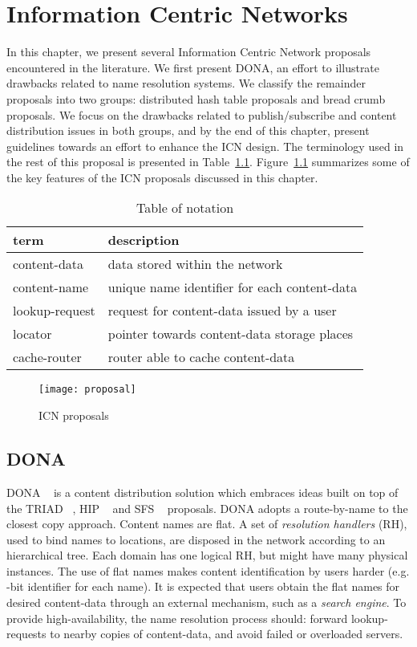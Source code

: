 \chapter{Information Centric Networks}
\label{chapt:icn}
 
In this chapter, we present several Information Centric Network proposals encountered in the literature.
We first present DONA, an effort to illustrate drawbacks related to name resolution systems.
We classify the remainder proposals into two groups:  distributed hash table proposals and 
bread crumb proposals. We focus on the drawbacks related to publish/subscribe and content distribution issues
in both groups, and by the end of this chapter, present guidelines towards an effort to enhance the ICN design. 
The terminology used in the rest of this proposal is presented in Table~\ref{terminology}.  
Figure~\ref{tabproposals} summarizes some of the key features of the ICN proposals discussed in this chapter.


\vspace{0.1in}

\begin{table}[h!]
\center
\begin{tabular}{l|l}
\hline
\textbf{term} & \textbf{description} \\
\hline
\hline
content-data & data stored within the network \\
content-name &  unique name identifier for each content-data \\ 
lookup-request & request for content-data issued by a user \\
locator &  pointer towards content-data storage places \\
cache-router & router able to cache content-data \\
\hline
\end{tabular}
\caption{Table of notation}
\label{terminology}
\end{table}

 
\begin{figure}
\center
\texttt{[image: proposal]}
\label{tabproposals}
\caption{ICN proposals}
\end{figure}


\section{DONA}

DONA ~\cite{dona} is a content distribution solution which embraces ideas built on top of the 
TRIAD ~\cite{triad}, HIP ~\cite{hip} and SFS ~\cite{sfs} proposals. 
DONA adopts a route-by-name to the closest copy approach. Content names are flat. A set of 
\emph{resolution handlers} (RH), used to bind names to locations, are disposed in the network according to an hierarchical tree. Each domain 
has one logical RH, but might have  many physical instances. The use of flat names makes content identification by users
harder (e.g. -bit identifier for each name). It is expected that users obtain the flat names for desired content-data 
through an external mechanism, such as a \emph{search engine}. To provide high-availability, the name resolution process should: 
 forward lookup-requests to nearby copies of content-data, and  avoid failed or overloaded servers. 

